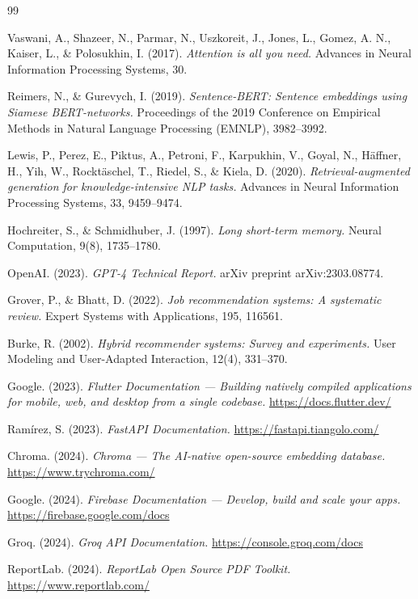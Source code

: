 \documentclass[12pt, a4paper, oneside]{report}
\begin{document}
\begin{thebibliography}{99}

Vaswani, A., Shazeer, N., Parmar, N., Uszkoreit, J., Jones, L., Gomez, A. N., Kaiser, L.,
\& Polosukhin, I. (2017).
\textit{Attention is all you need.}
Advances in Neural Information Processing Systems, 30.

Reimers, N., \& Gurevych, I. (2019).
\textit{Sentence-BERT: Sentence embeddings using Siamese BERT-networks.}
Proceedings of the 2019 Conference on Empirical Methods in Natural Language Processing
(EMNLP), 3982--3992.

Lewis, P., Perez, E., Piktus, A., Petroni, F., Karpukhin, V., Goyal, N.,
H\"{a}ffner, H., Yih, W., Rockt\"{a}schel, T., Riedel, S., \& Kiela, D. (2020).
\textit{Retrieval-augmented generation for knowledge-intensive NLP tasks.}
Advances in Neural Information Processing Systems, 33, 9459--9474.

Hochreiter, S., \& Schmidhuber, J. (1997).
\textit{Long short-term memory.}
Neural Computation, 9(8), 1735--1780.

OpenAI. (2023).
\textit{GPT-4 Technical Report.}
arXiv preprint arXiv:2303.08774.

Grover, P., \& Bhatt, D. (2022).
\textit{Job recommendation systems: A systematic review.}
Expert Systems with Applications, 195, 116561.

Burke, R. (2002).
\textit{Hybrid recommender systems: Survey and experiments.}
User Modeling and User-Adapted Interaction, 12(4), 331--370.

Google. (2023).
\textit{Flutter Documentation — Building natively compiled applications for mobile, web, and
desktop from a single codebase.}
\url{https://docs.flutter.dev/}

Ram\'{i}rez, S. (2023).
\textit{FastAPI Documentation.}
\url{https://fastapi.tiangolo.com/}

Chroma. (2024).
\textit{Chroma — The AI-native open-source embedding database.}
\url{https://www.trychroma.com/}

Google. (2024).
\textit{Firebase Documentation — Develop, build and scale your apps.}
\url{https://firebase.google.com/docs}

Groq. (2024).
\textit{Groq API Documentation.}
\url{https://console.groq.com/docs}

ReportLab. (2024).
\textit{ReportLab Open Source PDF Toolkit.}
\url{https://www.reportlab.com/}

\end{thebibliography}
\end{document}
